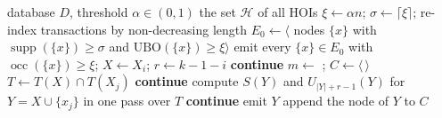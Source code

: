 \documentclass[pdflatex,sn-mathphys,Numbered]{sn-jnl}
\theoremstyle{thmstyleone}
\theoremstyle{thmstyletwo}
\theoremstyle{thmstylethree}
\newcommand{\supp}{\operatorname{supp}}
\newcommand{\socc}{\operatorname{occ}}
\newcommand{\Ubo}{\mathrm{UBO}}
\newcommand{\Ucap}{U}
\newcommand{\AURA}{AURA-HOI}
\begin{document}
\begin{algorithm}[t]
\caption{\AURA{}}\label{alg:aura}
\begin{algorithmic}[1]
\Require database $D$, threshold $\alpha \in (0,1)$
\Ensure the set $\mathcal{H}$ of all HOIs
\State $\xi \gets \alpha n$; $\sigma \gets \lceil \xi \rceil$; re-index transactions by non-decreasing length
\State $E_0 \gets \langle$ nodes $\{x\}$ with $\supp(\{x\}) \ge \sigma$ and $\Ubo(\{x\}) \ge \xi \rangle$ 
\State emit every $\{x\} \in E_0$ with $\socc(\{x\}) \ge \xi$; 
    \State $X \gets X_i$; $r \gets k - 1 - i$
     \textbf{continue} 
    \EndIf
    \State $m \gets$ ; $C \gets \langle\, \rangle$
      \State $T \gets T(X) \cap T(X_j)$ 
       \textbf{continue} 
      \EndIf
      \State compute $S(Y)$ and $\Ucap_{|Y| + r - 1}(Y)$ for $Y = X \cup \{x_j\}$ in one pass over $T$
      \If{$\Ucap_{|Y| + r - 1}(Y) < \xi$} \textbf{continue} 
      \EndIf
       emit $Y$
      \EndIf
      \State append the node of $Y$ to $C$
    \EndFor
      
    \EndIf
    \State {}
  \EndFor
\EndProcedure
\end{algorithmic}
\end{algorithm}
\end{document}
